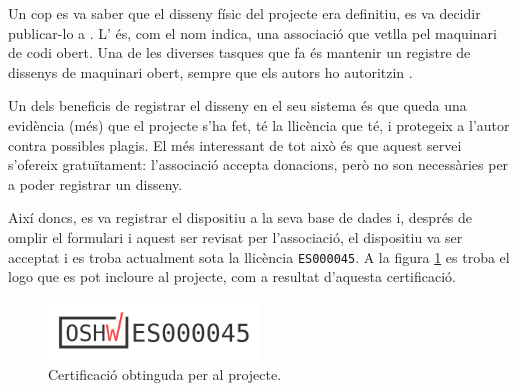 Un cop es va saber que el disseny físic del projecte era definitiu, es va decidir
publicar-lo a . L' és, com el
nom indica, una associació que vetlla pel maquinari de codi obert. Una de les
diverses tasques que fa és mantenir un registre de dissenys de maquinari obert,
sempre que els autors ho autoritzin \cite{Oshwa}.

Un dels beneficis de registrar el disseny en el seu sistema és que queda una
evidència (més) que el projecte s'ha fet, té la llicència que té, i protegeix
a l'autor contra possibles plagis. El més interessant de tot això és que aquest
servei s'ofereix gratuïtament: l'associació accepta donacions, però no son
necessàries per a poder registrar un disseny.

Així doncs, es va registrar el dispositiu a la seva base de dades i, després
de omplir el formulari i aquest ser revisat per l'associació, el dispositiu
va ser acceptat i es troba actualment sota la llicència \verb|ES000045|.
A la figura \ref{fig:oshwa} es troba el logo que es pot incloure al projecte,
com a resultat d'aquesta certificació.

\begin{figure}[ht]
    \centering
    \includegraphics[width=0.5\textwidth]{images/oshwa.png}
    \caption{Certificació  obtinguda per al projecte.}
    \label{fig:oshwa}
\end{figure}

